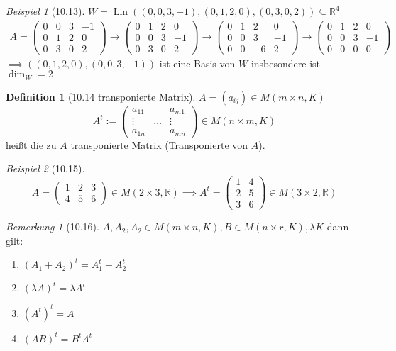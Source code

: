 \documentclass[a4paper]{scrartcl}
\DeclareMathOperator{\Lin}{Lin}
\theoremstyle{definition}
\newtheorem{defn}{Definition}
\theoremstyle{plain}
\theoremstyle{plain}
\theoremstyle{remark}
\newtheorem{remark}{Bemerkung}
\theoremstyle{remark}
\theoremstyle{remark}
\theoremstyle{remark}
\theoremstyle{remark}
\newtheorem{ex}{Beispiel}
\begin{document}
\begin{ex}[10.13]
$W = \Lin((0,0,3,-1), (0, 1, 2, 0), (0, 3, 0, 2)) \subseteq \mathbb{R}^4$
\begin{gather}
A = \begin{pmatrix}
0 & 0 & 3 & -1 \\
0 & 1 & 2 & 0 \\
0 & 3 & 0 & 2
\end{pmatrix}
\to
\begin{pmatrix}
0 & 1 & 2 & 0 \\
0 & 0 & 3 & -1 \\
0 & 3 & 0 & 2
\end{pmatrix}
\to
\begin{pmatrix}
0 & 1 & 2 & 0 \\
0 & 0 & 3 & -1 \\
0 & 0 & -6 & 2
\end{pmatrix}
\to
\begin{pmatrix}
0 & 1 & 2 & 0 \\
0 & 0 & 3 & -1 \\
0 & 0 & 0 & 0
\end{pmatrix}
\end{gather}
$\implies ((0,1,2,0), (0,0,3,-1))$ ist eine Basis von $W$ insbesondere ist $\dim_W = 2$
\end{ex}
\begin{defn}[10.14 transponierte Matrix]
$A = (a_{ij}) \in M(m\times n, K)$
\[A^t := \begin{pmatrix} a_{11} & & a_{m1} \\ \vdots & \ldots & \vdots \\ a_{1n} & & a_{mn} \end{pmatrix} \in M(n\times m, K)\]
heißt die zu $A$ transponierte Matrix (Transponierte von $A$).
\end{defn}
\begin{ex}[10.15]
\[A = \begin{pmatrix} 1 & 2 & 3 \\ 4 & 5 & 6\end{pmatrix} \in M(2\times 3, \mathbb{R}) \implies A^t = \begin{pmatrix} 1 & 4 \\ 2 & 5 \\ 3 & 6 \end{pmatrix} \in M(3\times 2, \mathbb{R})\]
\end{ex}
\begin{remark}[10.16]
$A, A_2, A_2 \in M(m\times n, K), B\in M(n\times r, K), \lambda K$ dann gilt:
\begin{enumerate}
\item $(A_1 + A_2)^t = A_1^t + A_2^t$
\item $(\lambda A)^t = \lambda A^t$
\item $(A^t)^t = A$
\item $(AB)^t = B^t A^t$
\end{enumerate}
\end{remark}
\end{document}
